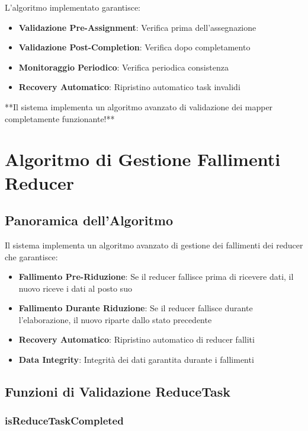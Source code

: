 \documentclass[12pt,a4paper]{article}
\begin{document}
L'algoritmo implementato garantisce:

\begin{itemize}
\item \textbf{Validazione Pre-Assignment}: Verifica prima dell'assegnazione
\item \textbf{Validazione Post-Completion}: Verifica dopo completamento
\item \textbf{Monitoraggio Periodico}: Verifica periodica consistenza
\item \textbf{Recovery Automatico}: Ripristino automatico task invalidi
\end{itemize}

**Il sistema implementa un algoritmo avanzato di validazione dei mapper completamente funzionante!**

\section{Algoritmo di Gestione Fallimenti Reducer}

\subsection{Panoramica dell'Algoritmo}

Il sistema implementa un algoritmo avanzato di gestione dei fallimenti dei reducer che garantisce:

\begin{itemize}
\item \textbf{Fallimento Pre-Riduzione}: Se il reducer fallisce prima di ricevere dati, il nuovo riceve i dati al posto suo
\item \textbf{Fallimento Durante Riduzione}: Se il reducer fallisce durante l'elaborazione, il nuovo riparte dallo stato precedente
\item \textbf{Recovery Automatico}: Ripristino automatico di reducer falliti
\item \textbf{Data Integrity}: Integrità dei dati garantita durante i fallimenti
\end{itemize}

\subsection{Funzioni di Validazione ReduceTask}

\subsubsection{isReduceTaskCompleted}
\end{document}
